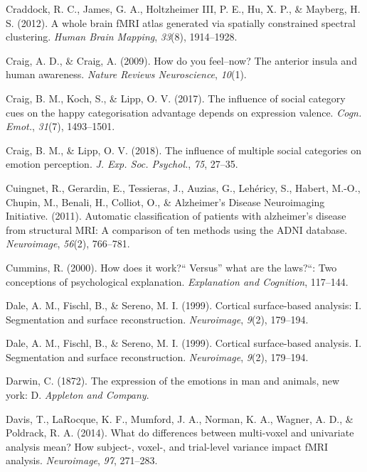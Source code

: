 \documentclass[11pt,american,]{memoir} %
\begin{document}
\leavevmode\hypertarget{ref-craddock2012whole}{}%
Craddock, R. C., James, G. A., Holtzheimer III, P. E., Hu, X. P., \& Mayberg, H. S. (2012). A whole brain fMRI atlas generated via spatially constrained spectral clustering. \emph{Human Brain Mapping}, \emph{33}(8), 1914--1928.

\leavevmode\hypertarget{ref-craig2009you}{}%
Craig, A. D., \& Craig, A. (2009). How do you feel--now? The anterior insula and human awareness. \emph{Nature Reviews Neuroscience}, \emph{10}(1).

\leavevmode\hypertarget{ref-Craig2017-db}{}%
Craig, B. M., Koch, S., \& Lipp, O. V. (2017). The influence of social category cues on the happy categorisation advantage depends on expression valence. \emph{Cogn. Emot.}, \emph{31}(7), 1493--1501.

\leavevmode\hypertarget{ref-Craig2018-jm}{}%
Craig, B. M., \& Lipp, O. V. (2018). The influence of multiple social categories on emotion perception. \emph{J. Exp. Soc. Psychol.}, \emph{75}, 27--35.

\leavevmode\hypertarget{ref-Cuingnet2011-hv}{}%
Cuingnet, R., Gerardin, E., Tessieras, J., Auzias, G., Lehéricy, S., Habert, M.-O., Chupin, M., Benali, H., Colliot, O., \& Alzheimer's Disease Neuroimaging Initiative. (2011). Automatic classification of patients with alzheimer's disease from structural MRI: A comparison of ten methods using the ADNI database. \emph{Neuroimage}, \emph{56}(2), 766--781.

\leavevmode\hypertarget{ref-Cummins2000-pk}{}%
Cummins, R. (2000). How does it work?{}`` Versus'' what are the laws?{}``: Two conceptions of psychological explanation. \emph{Explanation and Cognition}, 117--144.

\leavevmode\hypertarget{ref-dale1999cortical}{}%
Dale, A. M., Fischl, B., \& Sereno, M. I. (1999). Cortical surface-based analysis: I. Segmentation and surface reconstruction. \emph{Neuroimage}, \emph{9}(2), 179--194.

\leavevmode\hypertarget{ref-Dale1999-rk}{}%
Dale, A. M., Fischl, B., \& Sereno, M. I. (1999). Cortical surface-based analysis. I. Segmentation and surface reconstruction. \emph{Neuroimage}, \emph{9}(2), 179--194.

\leavevmode\hypertarget{ref-Darwin1872-nv}{}%
Darwin, C. (1872). The expression of the emotions in man and animals, new york: D. \emph{Appleton and Company}.

\leavevmode\hypertarget{ref-Davis2014-lw}{}%
Davis, T., LaRocque, K. F., Mumford, J. A., Norman, K. A., Wagner, A. D., \& Poldrack, R. A. (2014). What do differences between multi-voxel and univariate analysis mean? How subject-, voxel-, and trial-level variance impact fMRI analysis. \emph{Neuroimage}, \emph{97}, 271--283.
\end{document}
